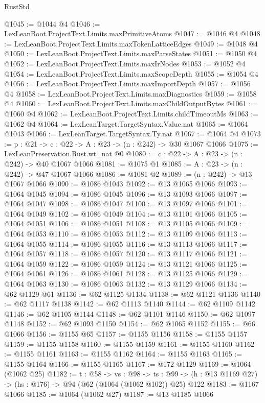 \begin{lexlean}{RustStd}
\begin{coremodule}
@1045 := @1044 @4
@1046 := LexLeanBoot.ProjectText.Limits.maxPrimitiveAtoms
@1047 := @1046 @4
@1048 := LexLeanBoot.ProjectText.Limits.maxTokenLatticeEdges
@1049 := @1048 @4
@1050 := LexLeanBoot.ProjectText.Limits.maxParseStates
@1051 := @1050 @4
@1052 := LexLeanBoot.ProjectText.Limits.maxIrNodes
@1053 := @1052 @4
@1054 := LexLeanBoot.ProjectText.Limits.maxScopeDepth
@1055 := @1054 @4
@1056 := LexLeanBoot.ProjectText.Limits.maxImportDepth
@1057 := @1056 @4
@1058 := LexLeanBoot.ProjectText.Limits.maxDiagnostics
@1059 := @1058 @4
@1060 := LexLeanBoot.ProjectText.Limits.maxChildOutputBytes
@1061 := @1060 @4
@1062 := LexLeanBoot.ProjectText.Limits.childTimeoutMs
@1063 := @1062 @4
@1064 := LexLeanTarget.TargetSyntax.Value.nat
@1065 := @1064 @1043
@1066 := LexLeanTarget.TargetSyntax.Ty.nat
@1067 := @1064 @4
@1073 := {p : @21} -> {c : @22} -> {A : @23} -> (n : @242) -> @30 @1067 @1066
@1075 := LexLeanPreservation.Rust.wt_nat @0
@1080 := {c : @22} -> {A : @23} -> (n : @242) -> @40 @1067 @1066
@1081 := @1075 @1
@1085 := {A : @23} -> (n : @242) -> @47 @1067 @1066
@1086 := @1081 @2
@1089 := (n : @242) -> @13 @1067 @1066
@1090 := @1086 @1043
@1092 := @13 @1065 @1066
@1093 := @1064 @1045
@1094 := @1086 @1045
@1096 := @13 @1093 @1066
@1097 := @1064 @1047
@1098 := @1086 @1047
@1100 := @13 @1097 @1066
@1101 := @1064 @1049
@1102 := @1086 @1049
@1104 := @13 @1101 @1066
@1105 := @1064 @1051
@1106 := @1086 @1051
@1108 := @13 @1105 @1066
@1109 := @1064 @1053
@1110 := @1086 @1053
@1112 := @13 @1109 @1066
@1113 := @1064 @1055
@1114 := @1086 @1055
@1116 := @13 @1113 @1066
@1117 := @1064 @1057
@1118 := @1086 @1057
@1120 := @13 @1117 @1066
@1121 := @1064 @1059
@1122 := @1086 @1059
@1124 := @13 @1121 @1066
@1125 := @1064 @1061
@1126 := @1086 @1061
@1128 := @13 @1125 @1066
@1129 := @1064 @1063
@1130 := @1086 @1063
@1132 := @13 @1129 @1066
@1134 := @62 @1129 @61
@1136 := @62 @1125 @1134
@1138 := @62 @1121 @1136
@1140 := @62 @1117 @1138
@1142 := @62 @1113 @1140
@1144 := @62 @1109 @1142
@1146 := @62 @1105 @1144
@1148 := @62 @1101 @1146
@1150 := @62 @1097 @1148
@1152 := @62 @1093 @1150
@1154 := @62 @1065 @1152
@1155 := @66 @1066
@1156 := @1155 @65
@1157 := @1155 @1156
@1158 := @1155 @1157
@1159 := @1155 @1158
@1160 := @1155 @1159
@1161 := @1155 @1160
@1162 := @1155 @1161
@1163 := @1155 @1162
@1164 := @1155 @1163
@1165 := @1155 @1164
@1166 := @1155 @1165
@1167 := @172 @1129
@1169 := @1064 (@1062 @25)
@1182 := {t : @58} ->
  {vs : @98} ->
  {ts : @99} -> (h : @13 @1169 @27) -> (hs : @176) -> @94 (@62 (@1064 (@1062 @102)) @25) @122
@1183 := @1167 @1066
@1185 := @1064 (@1062 @27)
@1187 := @13 @1185 @1066

\end{coremodule}
\end{lexlean}
